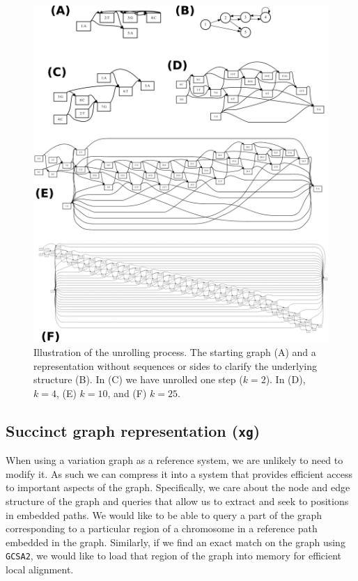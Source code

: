 \documentclass[12pt]{article}
\newcommand{\gcsa}{{\tt GCSA2}}
\begin{document}
\begin{figure}[t]
\centering
\includegraphics[width=1.0\textwidth]{figures/kdagify}
\caption{\label{fig:kdagify}
  Illustration of the unrolling process. The starting graph (A) and a representation without sequences or sides to clarify the underlying structure (B).
  In (C) we have unrolled one step ($k = 2$). In (D), $k = 4$, (E) $k = 10$, and (F) $k = 25$.
}
\end{figure}

\subsection{Succinct graph representation ({\tt xg})}

When using a variation graph as a reference system, we are unlikely to need to modify it.
As such we can compress it into a system that provides efficient access to important aspects of the graph.
Specifically, we care about the node and edge structure of the graph and queries that allow us to extract and seek to positions in embedded paths.
We would like to be able to query a part of the graph corresponding to a particular region of a chromosome in a reference path embedded in the graph.
Similarly, if we find an exact match on the graph using \gcsa, we would like to load that region of the graph into memory for efficient local alignment.
\end{document}
